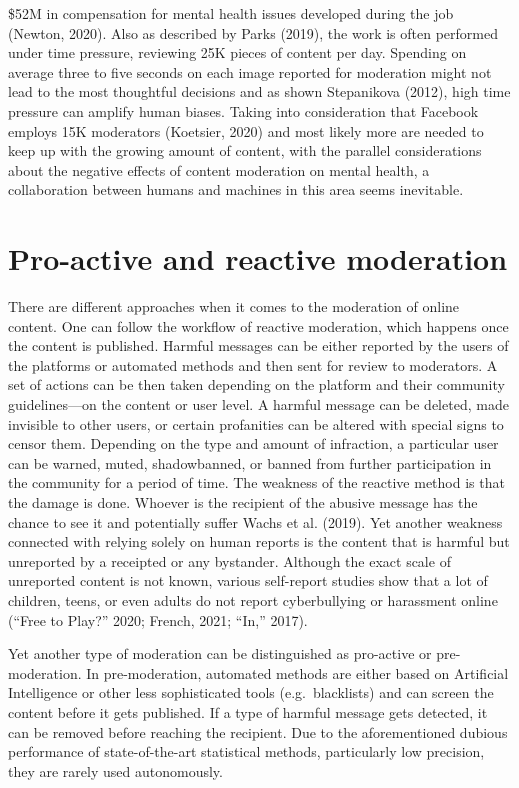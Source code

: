 \documentclass[
  10pt,
  dvipsnames,enabledeprecatedfontcommands]{scrartcl}
\begin{document}
\$52M in compensation for mental health issues developed during the job
(Newton, 2020). Also as described by Parks (2019), the work is often
performed under time pressure, reviewing 25K pieces of content per day.
Spending on average three to five seconds on each image reported for
moderation might not lead to the most thoughtful decisions and as shown
Stepanikova (2012), high time pressure can amplify human biases. Taking
into consideration that Facebook employs 15K moderators (Koetsier, 2020)
and most likely more are needed to keep up with the growing amount of
content, with the parallel considerations about the negative effects of
content moderation on mental health, a collaboration between humans and
machines in this area seems inevitable.

\hypertarget{pro-active-and-reactive-moderation}{%
\section{Pro-active and reactive
moderation}\label{pro-active-and-reactive-moderation}}

There are different approaches when it comes to the moderation of online
content. One can follow the workflow of reactive moderation, which
happens once the content is published. Harmful messages can be either
reported by the users of the platforms or automated methods and then
sent for review to moderators. A set of actions can be then taken
depending on the platform and their community guidelines---on the
content or user level. A harmful message can be deleted, made invisible
to other users, or certain profanities can be altered with special signs
to censor them. Depending on the type and amount of infraction, a
particular user can be warned, muted, shadowbanned, or banned from
further participation in the community for a period of time. The
weakness of the reactive method is that the damage is done. Whoever is
the recipient of the abusive message has the chance to see it and
potentially suffer Wachs et al. (2019). Yet another weakness connected
with relying solely on human reports is the content that is harmful but
unreported by a receipted or any bystander. Although the exact scale of
unreported content is not known, various self-report studies show that a
lot of children, teens, or even adults do not report cyberbullying or
harassment online ({``Free to {Play}?''} 2020; French, 2021; {``In,''}
2017).

Yet another type of moderation can be distinguished as pro-active or
pre-moderation. In pre-moderation, automated methods are either based on
Artificial Intelligence or other less sophisticated tools
(e.g.~blacklists) and can screen the content before it gets published.
If a type of harmful message gets detected, it can be removed before
reaching the recipient. Due to the aforementioned dubious performance of
state-of-the-art statistical methods, particularly low precision, they
are rarely used autonomously.
\end{document}
